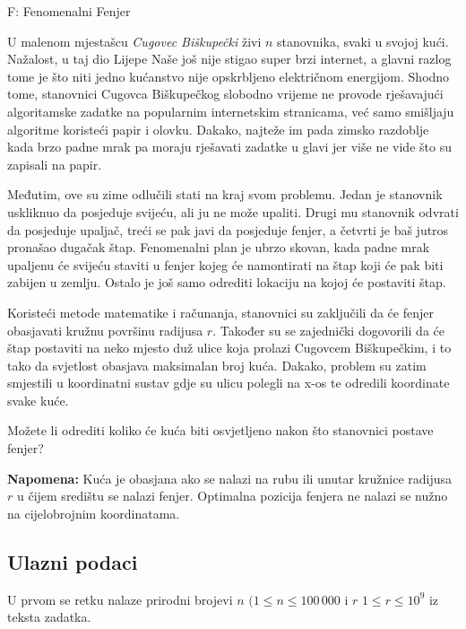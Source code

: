 \begin{statement}[
  timelimit=1 s,
  memorylimit=512 MiB,
]{F: Fenomenalni Fenjer}

U malenom mjestašcu \textit{Cugovec Biškupečki} živi $n$ stanovnika, svaki u
svojoj kući. Nažalost, u taj dio Lijepe Naše još nije stigao super brzi
internet, a glavni razlog tome je što niti jedno kućanstvo nije opskrbljeno
električnom energijom. Shodno tome, stanovnici Cugovca Biškupečkog slobodno
vrijeme ne provode rješavajući algoritamske zadatke na popularnim
internetskim stranicama, već samo smišljaju algoritme koristeći papir i
olovku. Dakako, najteže im pada zimsko razdoblje kada brzo padne mrak pa
moraju rješavati zadatke u glavi jer više ne vide što su zapisali na papir.

Međutim, ove su zime odlučili stati na kraj svom problemu. Jedan je stanovnik
uskliknuo da posjeduje svijeću, ali ju ne može upaliti. Drugi mu stanovnik
odvrati da posjeduje upaljač, treći se pak javi da posjeduje fenjer, a
četvrti je baš jutros pronašao dugačak štap. Fenomenalni plan je ubrzo
skovan, kada padne mrak upaljenu će svijeću staviti u fenjer kojeg će
namontirati na štap koji će pak biti zabijen u zemlju. Ostalo je još samo
odrediti lokaciju na kojoj će postaviti štap.

Koristeći metode matematike i računanja, stanovnici su zaključili da će fenjer
obasjavati kružnu površinu radijusa $r$. Također su se zajednički dogovorili
da će štap postaviti na neko mjesto duž ulice koja prolazi Cugovcem
Biškupečkim, i to tako da svjetlost obasjava maksimalan broj kuća. Dakako,
problem su zatim smjestili u koordinatni sustav gdje su ulicu polegli na x-os
te odredili koordinate svake kuće.

Možete li odrediti koliko će kuća biti osvjetljeno nakon što stanovnici postave
fenjer?

\textbf{Napomena:} Kuća je obasjana ako se nalazi na rubu ili unutar kružnice
radijusa $r$ u čijem središtu se nalazi fenjer. Optimalna pozicija fenjera ne
nalazi se nužno na cijelobrojnim koordinatama.

\subsection*{Ulazni podaci}
U prvom se retku nalaze prirodni brojevi $n$ $(1 \le n \le 100\,000$ i $r$
$1 \le r \le 10^9$ iz teksta zadatka.


\end{statement}
